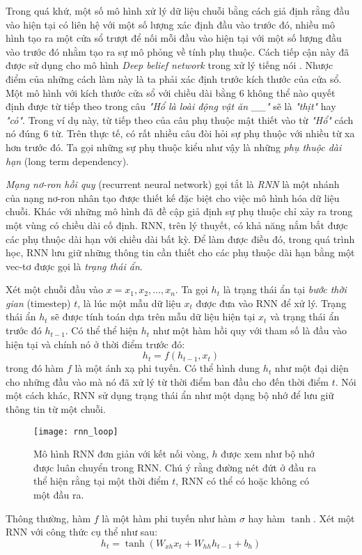 Trong quá khứ, một số mô hình xử lý dữ liệu chuỗi bằng cách giả định rằng đầu vào hiện tại có liên hệ với một số lượng xác định đầu vào trước đó, nhiều mô hình tạo ra một cửa sổ trượt để nối mỗi đầu vào hiện tại với một số lượng đầu vào trước đó nhằm tạo ra sự mô phỏng về tính phụ thuộc. Cách tiếp cận này đã được sử dụng cho mô hình \textit{Deep belief network} trong xử lý tiếng nói \cite{massetal2012}. Nhược điểm của những cách làm này là ta phải xác định trước kích thước của cửa sổ. Một mô hình với kích thước cửa sổ với chiều dài bằng 6 không thể nào quyết định được từ tiếp theo trong câu \textit{"Hổ là loài động vật ăn \_\_"} sẽ là \textit{"thịt"} hay \textit{"cỏ"}. Trong ví dụ này, từ tiếp theo của câu phụ thuộc mật thiết vào từ \textit{"Hổ"} cách nó đúng 6 từ. Trên thực tế, có rất nhiều câu đòi hỏi sự phụ thuộc với nhiều từ xa hơn trước đó. Ta gọi những sự phụ thuộc kiểu như vậy là những \textit{phụ thuộc dài hạn} (long term dependency). 

\textit{Mạng nơ-ron hồi quy} (recurrent neural network) \cite{elman1990} gọi tắt là \textit{RNN} là một nhánh của nạng nơ-ron nhân tạo được thiết kế đặc biệt cho việc mô hình hóa dữ liệu chuỗi. Khác với những mô hình đã đề cập giả định sự phụ thuộc chỉ xảy ra trong một vùng có chiều dài cố định. RNN, trên lý thuyết, có khả năng nắm bắt được các phụ thuộc dài hạn với chiều dài bất kỳ. Để làm được điều đó, trong quá trình học, RNN lưu giữ những thông tin cần thiết cho các phụ thuộc dài hạn bằng một vec-tơ được gọi là \textit{trạng thái ẩn}.

Xét một chuỗi đầu vào $x={x_1,x_2,...,x_n}$. Ta gọi $h_t$ là trạng thái ẩn tại \textit{bước thời gian} (timestep) $t$, là lúc một mẫu dữ liệu $x_t$ được đưa vào RNN để xử lý. Trạng thái ẩn $h_t$ sẽ được tính toán dựa trên mẫu dữ liệu hiện tại $x_t$ và trạng thái ẩn trước đó $h_{t-1}$. Có thể thể hiện $h_t$ như một hàm hồi quy với tham số là đầu vào hiện tại và chính nó ở thời điểm trước đó:
\begin{equation} \label{basicRnnEquation}
	h_t = f \left(h_{t-1}, x_t \right)
\end{equation}
trong đó hàm $f$ là một ánh xạ phi tuyến. Có thể hình dung $h_t$ như một đại diện cho những đầu vào mà nó đã xử lý từ thời điểm ban đầu cho đến thời điểm $t$. Nói một cách khác, RNN sử dụng trạng thái ẩn như một dạng bộ nhớ để lưu giữ thông tin từ một chuỗi.

\begin{figure}
	\centering
	\texttt{[image: rnn\_loop]}
	\caption[Mô hình RNN với kết nối vòng]{Mô hình RNN đơn giản với kết nối vòng, \textbf{$h$} được xem như bộ nhớ được luân chuyển trong RNN. Chú ý rằng đường nét đứt ở đầu ra thể hiện rằng tại một thời điểm $t$, RNN có thể có hoặc không có một đầu ra.}
	\label{fig_rnn_loop}
\end{figure}
Thông thường, hàm $f$ là một hàm phi tuyến như hàm \textit{$\sigma$} hay hàm \textit{$\tanh$}. Xét một RNN với công thức cụ thể như sau:
\begin{equation} \label{rnnWithTanh}
	h_t = \tanh \left(W_{xh} x_t + W_{hh}h_{t-1} + b_h \right)
\end{equation}

